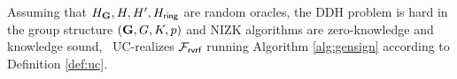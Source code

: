 

\begin{theorem}
	Assuming that $ H_{\mathbf{G}}, H,H', H_\mathsf{ring} $ are random oracles,  the DDH problem is hard in the group structure $ ({\mathbf{G}}, G,K, p) $ and NIZK algorithms are zero-knowledge and knowledge sound, \name \ UC-realizes $\mathcal{F}_{\textsf{rvrf}}$ running Algorithm \ref{alg:gensign} according to Definition \ref{def:uc}.
\end{theorem}

